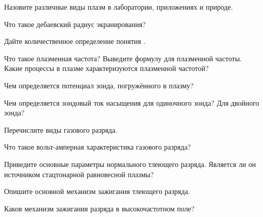 


\begin{lab:questions}

\item Назовите различные виды плазм в лаборатории, приложениях и природе.

\item Что такое дебаевский радиус экранирования?

\item Дайте количественное определение понятия .

\item Что такое плазменная частота? Выведите формулу для плазменной частоты.
Какие процессы в плазме характеризуются плазменной частотой?

\item Чем определяется потенциал зонда, погружённого в плазму?

\item Чем определяется зондовый ток насыщения для одиночного зонда? Для двойного
зонда?

\item Перечислите виды газового разряда.

\item Что такое вольт-амперная характеристика газового разряда?

\item Приведите основные параметры нормального тлеющего разряда. Является ли он
источником стацтонарной равновесной плазмы?

\item Опишите основной механизм зажигания тлеющего разряда.

\item Каков механизм зажигания разряда в высокочастотном поле?

\end{lab:questions}


